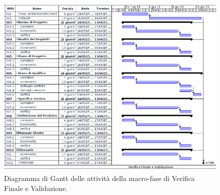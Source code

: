 \begin{figure}[h]
\begin{center}
\includegraphics[width=\textwidth, height=\textheight, keepaspectratio]{img/verival-gantt.png}
\caption{Diagramma di Gantt delle attività della macro-fase di Verifica Finale e Validazione.}
\end{center}
\end{figure}
\clearpage


